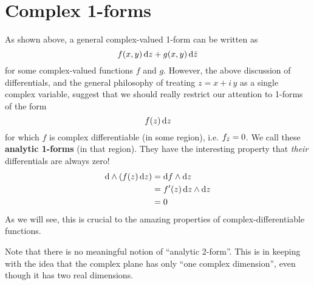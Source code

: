 \section{Complex 1-forms}
\label{sec:complex-1-forms}

As shown above, a general complex-valued 1-form can be written as
\[f(x,y) \,{\mathrm{d} z} + g(x,y)\,{\mathrm{d} \bar{z}}\]
for some complex-valued functions $f$ and $g$.
However, the above discussion of differentials, and the general philosophy of treating $z=x+i\,y$ as a single complex variable, suggest that we should really restrict our attention to 1-forms of the form
\[ f(z)\,{\mathrm{d} z} \]
for which $f$ is complex differentiable (in some region), i.e. ${f}_{\bar{z}} = 0$.
We call these \textbf{analytic 1-forms} (in that region).
They have the interesting property that \emph{their} differentials are always zero!
\begin{align*}
  \mathrm{d}\wedge(f(z)\,{\mathrm{d} z}) &= {\mathrm{d} f} \wedge {\ensuremath{\mathrm{d} z}}\\
  &= f'(z)\, {\mathrm{d} z} \wedge {\ensuremath{\mathrm{d} z}}\\
  &= 0
\end{align*}
As we will see, this is crucial to the amazing properties of complex-differentiable functions.

Note that there is no meaningful notion of ``analytic 2-form''.
This is in keeping with the idea that the complex plane has only ``one complex dimension'', even though it has two real dimensions.

